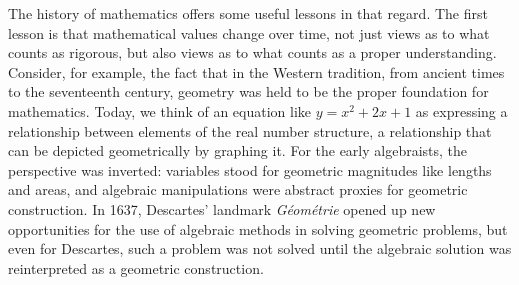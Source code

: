 \documentclass{amsart}
\theoremstyle{definition}
\theoremstyle{remark}
\numberwithin{equation}{section}
\begin{document}
The history of mathematics offers some useful lessons in that regard. The first lesson is that mathematical values change over time, not just views as to what counts as rigorous, but also views as to what counts as a proper understanding. Consider, for example, the fact that in the Western tradition, from ancient times to the seventeenth century, geometry was held to be the proper foundation for mathematics. Today, we think of an equation like $y = x^2 + 2 x + 1$ as expressing a relationship between elements of the real number structure, a relationship that can be depicted geometrically by graphing it. For the early algebraists, the perspective was inverted: variables stood for geometric magnitudes like lengths and areas, and algebraic manipulations were abstract proxies for geometric construction. In 1637, Descartes' landmark \emph{G\'eom\'etrie} opened up new opportunities for the use of algebraic methods in solving geometric problems, but even for Descartes, such a problem was not solved until the algebraic solution was reinterpreted as a geometric construction.
\end{document}
